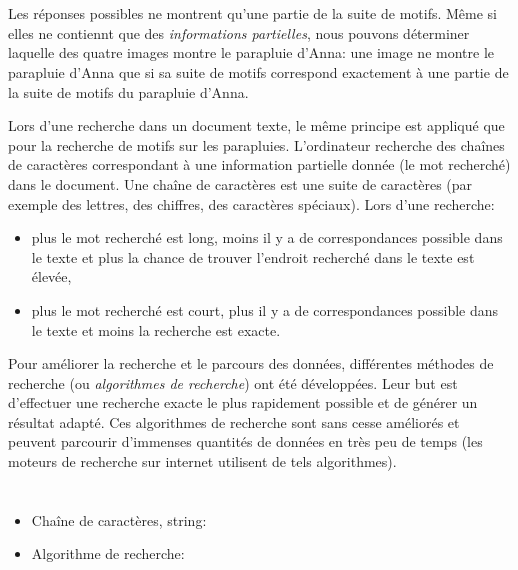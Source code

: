 {{%
\section*{\BrochureItsInformatics}
Les réponses possibles ne montrent qu’une partie de la suite de motifs. Même si elles ne contiennt que des \emph{informations partielles}, nous pouvons déterminer laquelle des quatre images montre le parapluie d’Anna: une image ne montre le parapluie d’Anna que si sa suite de motifs correspond exactement à une partie de la suite de motifs du parapluie d’Anna.

Lors d’une recherche dans un document texte, le même principe est appliqué que pour la recherche de motifs sur les parapluies. L’ordinateur recherche des chaînes de caractères correspondant à une information partielle donnée (le mot recherché) dans le document. Une chaîne de caractères est une suite de caractères (par exemple des lettres, des chiffres, des caractères spéciaux). Lors d’une recherche:

\begin{itemize}
  \item plus le mot recherché est long, moins il y a de correspondances possible dans le texte et plus la chance de trouver l’endroit recherché dans le texte est élevée,
  \item plus le mot recherché est court, plus il y a de correspondances possible dans le texte et moins la recherche est exacte.
\end{itemize}

Pour améliorer la recherche et le parcours des données, différentes méthodes de recherche (ou \emph{algorithmes de recherche}) ont été développées. Leur but est d’effectuer une recherche exacte le plus rapidement possible et de générer un résultat adapté. Ces algorithmes de recherche sont sans cesse améliorés et peuvent parcourir d’immenses quantités de données en très peu de temps (les moteurs de recherche sur internet utilisent de tels algorithmes).



\section*{\BrochureWebsitesAndKeywords}
{\raggedright
\begin{itemize}
  \item Chaîne de caractères, string: \href{https://fr.wikipedia.org/wiki/Cha\%C3\%AEne_de_caract\%C3\%A8res}{}
  \item Algorithme de recherche: \href{https://fr.wikipedia.org/wiki/Algorithme_de_recherche}{}
\end{itemize}


}}}
